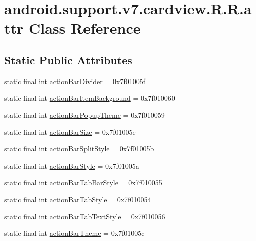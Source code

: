 \hypertarget{classandroid_1_1support_1_1v7_1_1cardview_1_1_r_1_1attr}{
\section{android.support.v7.cardview.R.R.attr Class Reference}
\label{classandroid_1_1support_1_1v7_1_1cardview_1_1_r_1_1attr}
}
\subsection*{Static Public Attributes}
\begin{CompactItemize}
\item 
static final int \hyperlink{classandroid_1_1support_1_1v7_1_1cardview_1_1_r_1_1attr_9a1ad5d0e1aa2742c8a8343459249ce9}{actionBarDivider} = 0x7f01005f
\item 
static final int \hyperlink{classandroid_1_1support_1_1v7_1_1cardview_1_1_r_1_1attr_961aea8befc1a8ae32a215ccd795acb8}{actionBarItemBackground} = 0x7f010060
\item 
static final int \hyperlink{classandroid_1_1support_1_1v7_1_1cardview_1_1_r_1_1attr_c8ea8c492c16557c6d7f0dc0aaf4c445}{actionBarPopupTheme} = 0x7f010059
\item 
static final int \hyperlink{classandroid_1_1support_1_1v7_1_1cardview_1_1_r_1_1attr_d48245218b6390d01ed044af97b49ee4}{actionBarSize} = 0x7f01005e
\item 
static final int \hyperlink{classandroid_1_1support_1_1v7_1_1cardview_1_1_r_1_1attr_0cb887b1dd764449ab6c253433e77f5b}{actionBarSplitStyle} = 0x7f01005b
\item 
static final int \hyperlink{classandroid_1_1support_1_1v7_1_1cardview_1_1_r_1_1attr_412d3eb379cb8f1913e985a3781b2265}{actionBarStyle} = 0x7f01005a
\item 
static final int \hyperlink{classandroid_1_1support_1_1v7_1_1cardview_1_1_r_1_1attr_2fb14d152913b948142177c93e6681b2}{actionBarTabBarStyle} = 0x7f010055
\item 
static final int \hyperlink{classandroid_1_1support_1_1v7_1_1cardview_1_1_r_1_1attr_1893cfce393a93c9f76fbf67c87762d8}{actionBarTabStyle} = 0x7f010054
\item 
static final int \hyperlink{classandroid_1_1support_1_1v7_1_1cardview_1_1_r_1_1attr_3be8bb64fcf3b29a0aca28ee57637095}{actionBarTabTextStyle} = 0x7f010056
\item 
static final int \hyperlink{classandroid_1_1support_1_1v7_1_1cardview_1_1_r_1_1attr_4f21786fdbe659e2db8f198fda59ee6d}{actionBarTheme} = 0x7f01005c

\end{CompactItemize}
